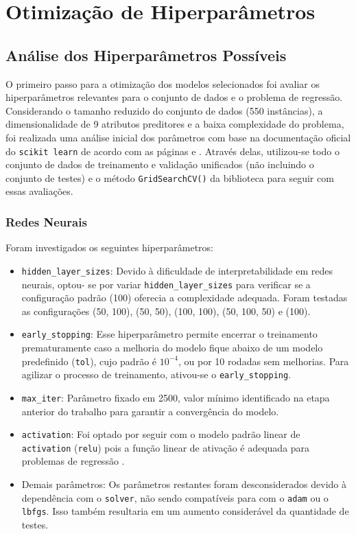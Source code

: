 \documentclass{report}
\let\oldsection\section
\renewcommand\section{\clearpage\oldsection}
\begin{document}
\section{Otimização de Hiperparâmetros} \label{sec: 5.1}

\subsection{Análise dos Hiperparâmetros Possíveis}

O primeiro passo para a otimização dos modelos selecionados foi avaliar os hiperparâmetros relevantes para o conjunto de dados e o problema de regressão. Considerando o tamanho reduzido do conjunto de dados
(550 instâncias), a dimensionalidade de 9 atributos preditores e a baixa complexidade do problema, foi realizada uma análise inicial dos parâmetros com base na documentação oficial do \texttt{scikit learn}
de acordo com as páginas \cite{RFR} e \cite{Regression}. Através delas, utilizou-se todo o conjunto de dados de treinamento e validação unificados (não incluindo o conjunto de testes) e o método \texttt{GridSearchCV()}
da biblioteca para seguir com essas avaliações.
\subsubsection{Redes Neurais}

Foram investigados os seguintes hiperparâmetros:
\begin{itemize}
    \item \texttt{hidden\_layer\_sizes}:
    Devido à dificuldade de interpretabilidade em redes neurais, optou-
    se por variar \texttt{hidden\_layer\_sizes} para verificar se a configuração padrão (100) oferecia a complexidade adequada. Foram testadas as configurações (50, 100), (50, 50), (100, 100), (50, 100, 50) e (100).
    \item \texttt{early\_stopping}:
    Esse hiperparâmetro permite encerrar o treinamento prematuramente caso a melhoria do modelo fique abaixo de um modelo predefinido (\texttt{tol}), cujo padrão é ${10^{-4}}$, ou por 10 rodadas sem melhorias. Para agilizar o processo de treinamento, ativou-se o \texttt{early\_stopping}.
    \item \texttt{max\_iter}:
    Parâmetro fixado em 2500, valor mínimo identificado na etapa anterior do trabalho para garantir a convergência do modelo.
    \item \texttt{activation}:
    Foi optado por seguir com o modelo padrão linear de \texttt{activation} (\texttt{relu}) pois a função linear de ativação é adequada para problemas de regressão \cite{AF}.
    \item Demais parâmetros:
    Os parâmetros restantes foram desconsiderados devido à dependência com o \texttt{solver}, não sendo compatíveis para com o \texttt{adam} ou o \texttt{lbfgs}. Isso também resultaria em um aumento considerável da quantidade de testes.
\end{itemize}
\end{document}

